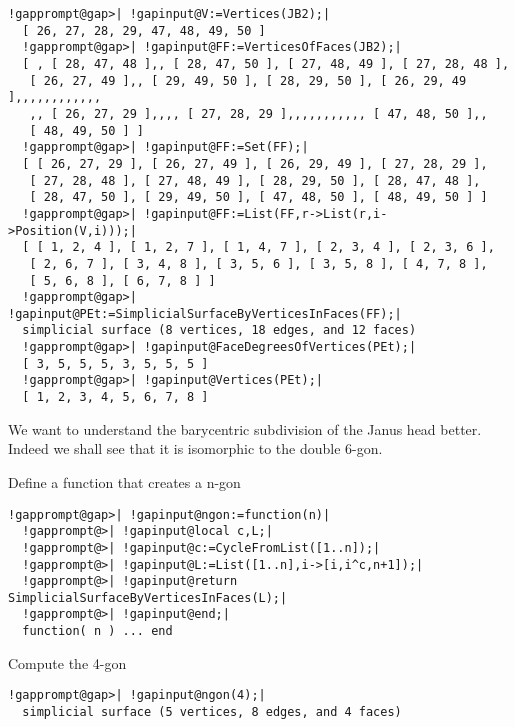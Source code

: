 \documentclass[a4paper,11pt]{report}
\begin{document}
{{{ 
\begin{Verbatim}[commandchars=!@|,fontsize=\small,frame=single,label=Example]
  !gapprompt@gap>| !gapinput@V:=Vertices(JB2);|
  [ 26, 27, 28, 29, 47, 48, 49, 50 ]
  !gapprompt@gap>| !gapinput@FF:=VerticesOfFaces(JB2);|
  [ , [ 28, 47, 48 ],, [ 28, 47, 50 ], [ 27, 48, 49 ], [ 27, 28, 48 ], 
   [ 26, 27, 49 ],, [ 29, 49, 50 ], [ 28, 29, 50 ], [ 26, 29, 49 ],,,,,,,,,,,,
   ,, [ 26, 27, 29 ],,,, [ 27, 28, 29 ],,,,,,,,,,, [ 47, 48, 50 ],, 
   [ 48, 49, 50 ] ]
  !gapprompt@gap>| !gapinput@FF:=Set(FF);|
  [ [ 26, 27, 29 ], [ 26, 27, 49 ], [ 26, 29, 49 ], [ 27, 28, 29 ], 
   [ 27, 28, 48 ], [ 27, 48, 49 ], [ 28, 29, 50 ], [ 28, 47, 48 ], 
   [ 28, 47, 50 ], [ 29, 49, 50 ], [ 47, 48, 50 ], [ 48, 49, 50 ] ]
  !gapprompt@gap>| !gapinput@FF:=List(FF,r->List(r,i->Position(V,i)));|
  [ [ 1, 2, 4 ], [ 1, 2, 7 ], [ 1, 4, 7 ], [ 2, 3, 4 ], [ 2, 3, 6 ], 
   [ 2, 6, 7 ], [ 3, 4, 8 ], [ 3, 5, 6 ], [ 3, 5, 8 ], [ 4, 7, 8 ], 
   [ 5, 6, 8 ], [ 6, 7, 8 ] ]
  !gapprompt@gap>| !gapinput@PEt:=SimplicialSurfaceByVerticesInFaces(FF);|
  simplicial surface (8 vertices, 18 edges, and 12 faces)
  !gapprompt@gap>| !gapinput@FaceDegreesOfVertices(PEt);|
  [ 3, 5, 5, 5, 3, 5, 5, 5 ]
  !gapprompt@gap>| !gapinput@Vertices(PEt);|
  [ 1, 2, 3, 4, 5, 6, 7, 8 ]
\end{Verbatim}
 

 We want to understand the barycentric subdivision of the Janus head better.
Indeed we shall see that it is isomorphic to the double 6-gon. 

 Define a function that creates a n-gon 

 
\begin{Verbatim}[commandchars=!@|,fontsize=\small,frame=single,label=Example]
  !gapprompt@gap>| !gapinput@ngon:=function(n)|
  !gapprompt@>| !gapinput@local c,L;|
  !gapprompt@>| !gapinput@c:=CycleFromList([1..n]);|
  !gapprompt@>| !gapinput@L:=List([1..n],i->[i,i^c,n+1]);|
  !gapprompt@>| !gapinput@return SimplicialSurfaceByVerticesInFaces(L);|
  !gapprompt@>| !gapinput@end;|
  function( n ) ... end
\end{Verbatim}
 

 Compute the 4-gon 

 
\begin{Verbatim}[commandchars=!@|,fontsize=\small,frame=single,label=Example]
  !gapprompt@gap>| !gapinput@ngon(4);|
  simplicial surface (5 vertices, 8 edges, and 4 faces)
\end{Verbatim}
 

}}}
\end{document}
